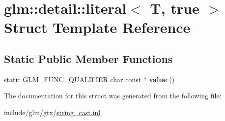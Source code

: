 \hypertarget{structglm_1_1detail_1_1literal_3_01T_00_01true_01_4}{}\section{glm\+:\+:detail\+:\+:literal$<$ T, true $>$ Struct Template Reference}
\label{structglm_1_1detail_1_1literal_3_01T_00_01true_01_4}
\subsection*{Static Public Member Functions}
\begin{DoxyCompactItemize}
\item 
\mbox{\label{structglm_1_1detail_1_1literal_3_01T_00_01true_01_4_ae18b91cfeeb373f6b7c62572f88cf239}} 
static G\+L\+M\+\_\+\+F\+U\+N\+C\+\_\+\+Q\+U\+A\+L\+I\+F\+I\+ER char const  $\ast$ {\bfseries value} ()
\end{DoxyCompactItemize}


The documentation for this struct was generated from the following file\+:\begin{DoxyCompactItemize}
\item 
include/glm/gtx/\hyperlink{string__cast_8inl}{string\+\_\+cast.\+inl}\end{DoxyCompactItemize}
